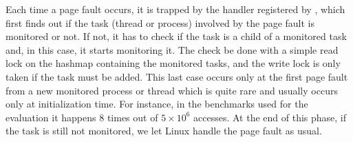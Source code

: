 

Each time a page fault occurs, it is trapped by the handler registered by
\Moca, which
first finds out if the task
(thread or process) involved by the page fault is
monitored or not. If not, it has to check if the task is a child of a monitored
task and, in this case, it starts monitoring it. The check be done with a simple
read lock on the hashmap containing the monitored tasks, and the write lock is
only taken if the task must be added.
This last case occurs only at the first page fault from a new monitored
process or thread which is quite rare and usually occurs only at
initialization time. For instance, in the benchmarks used for
the evaluation it happens $8$ times out of $5\times10^6$ accesses.
At the end of this phase, if the task is still not monitored, we let Linux handle the page fault as usual.

